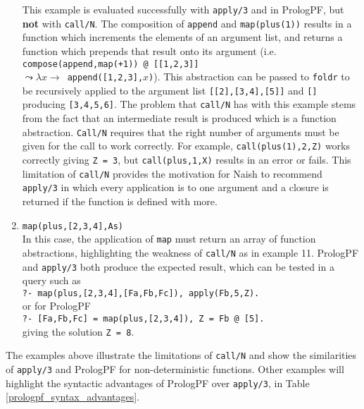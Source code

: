 \begin{enumerate}
{  This example is evaluated successfully with \texttt{apply/3} and in PrologPF,
  but \textbf{not} with \texttt{call/N}.  The composition of \texttt{append} and
  \texttt{map(plus(1))} results in a function which increments the elements of an
  argument list, and returns a function which prepends that result onto its
  argument (i.e. \texttt{compose(append,map(+1)) @ [[1,2,3]]} \\
  \mbox{$\leadsto \lambda x \rightarrow$ \texttt{append([1,2,3],$x$)}}).  This abstraction
  can be passed to \texttt{foldr} to be recursively applied to the argument list
  \texttt{[[2],[3,4],[5]]} and \texttt{[]} producing \texttt{[3,4,5,6]}.
  The problem that \texttt{call/N} has with this example stems from the fact that
  an intermediate result is produced which is a function abstraction.
  \texttt{Call/N} requires that the right number of arguments must be given for the
  call to work correctly.  For example, \texttt{call(plus(1),2,Z)} works correctly
  giving \texttt{Z = 3}, but \texttt{call(plus,1,X)} results in an error or fails.
  This limitation of \texttt{call/N} provides the motivation for Naish \cite{Nai96}
  to recommend \texttt{apply/3} in which every application is to one argument and
  a closure is returned if the function is defined with more.}
\item{\texttt{map(plus,[2,3,4],As)}\\
  In this case, the application of \texttt{map} must return an array of
  function abstractions, highlighting the weakness of \texttt{call/N} as in example
  11.  PrologPF and \texttt{apply/3} both produce the expected result, which can be tested 
  in a query such as\\
  \mbox{\texttt{?- map(plus,[2,3,4],[Fa,Fb,Fc]), apply(Fb,5,Z).}}\\ or for PrologPF\\
  \mbox{\texttt{?- [Fa,Fb,Fc] = map(plus,[2,3,4]), Z = Fb @ [5].}}\\ giving the
  solution \mbox{\texttt{Z = 8}}.}
\end{enumerate}

The examples above illustrate the limitations of \texttt{call/N} and show the similarities
of \texttt{apply/3} and PrologPF for non-deterministic functions.  Other examples will highlight
the syntactic advantages of PrologPF over \texttt{apply/3}, in
Table \ref{prologpf_syntax_advantages}.

